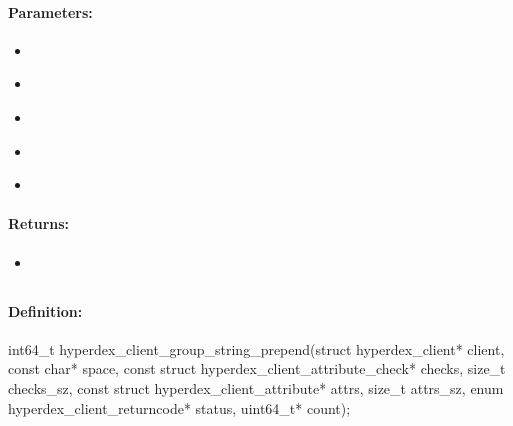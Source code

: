 \paragraph{Parameters:}
\begin{itemize}[noitemsep]
\item {}\\

\item {}\\

\item {}\\

\item {}\\

\item {}\\

\end{itemize}

\paragraph{Returns:}
\begin{itemize}[noitemsep]
\item {}\\

\end{itemize}

\pagebreak
\subsection{}
\label{api:c:group_string_prepend}


\paragraph{Definition:}
\begin{ccode}
int64_t hyperdex_client_group_string_prepend(struct hyperdex_client* client,
        const char* space,
        const struct hyperdex_client_attribute_check* checks, size_t checks_sz,
        const struct hyperdex_client_attribute* attrs, size_t attrs_sz,
        enum hyperdex_client_returncode* status,
        uint64_t* count);
\end{ccode}


